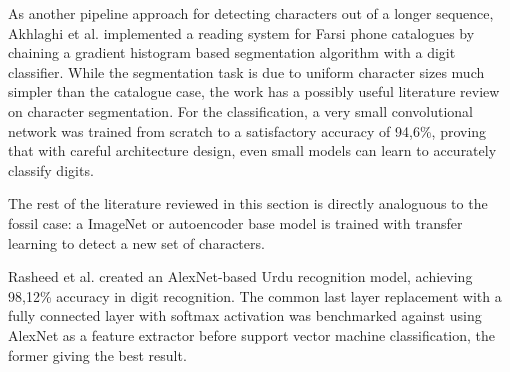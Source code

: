 \documentclass{article}
\begin{document}

As another pipeline approach for detecting characters out of a longer sequence, Akhlaghi et al. \cite{1akhlaghiFarsi} implemented 
a reading system for Farsi phone catalogues by chaining a gradient histogram based segmentation 
algorithm with a digit classifier. While the segmentation task is due to uniform character
 sizes much simpler than the catalogue case, the work has a possibly useful literature review on
  character segmentation. For the classification, a very small convolutional network was trained
   from scratch to a satisfactory accuracy of 94,6\%, proving that with careful architecture design,
    even small models can learn to accurately classify digits.


The rest of the literature reviewed in this section is directly analoguous 
to the fossil case: a ImageNet or autoencoder base model is trained with transfer learning to detect a new set of characters.



Rasheed et al. \cite{5rasheedHandwrittenUrduWAlexNet} created an AlexNet-based Urdu recognition 
model, achieving 98,12\% accuracy in digit recognition. The common last layer replacement 
with a fully connected layer with softmax activation was benchmarked against using AlexNet as 
a feature extractor before support vector 
machine classification, the former giving the best result.


\end{document}
